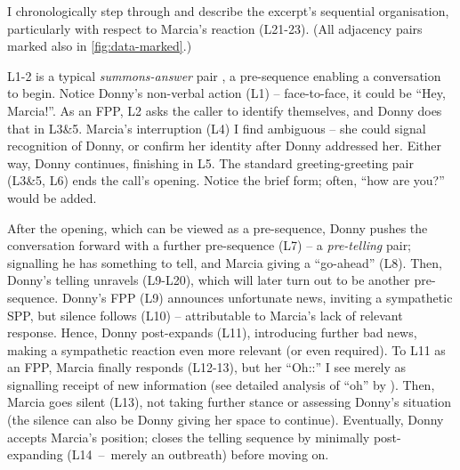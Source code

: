 \documentclass[11pt]{article}
\begin{document}
{	%
	I chronologically step through and describe the excerpt's sequential organisation, particularly with respect to Marcia's reaction (L21-23). (All adjacency pairs marked also in \autoref{fig:data-marked}.)

	L1-2 is a typical \textit{summons-answer} pair \citep[p.~126]{Liddicoat_2007}, a pre-sequence enabling a conversation to begin. Notice Donny's non-verbal action (L1) -- face-to-face, it could be ``Hey, Marcia!''.
	As an FPP, L2 asks the caller to identify themselves, and Donny does that in L3\&5.
	Marcia's interruption (L4) I find ambiguous -- she could signal recognition of Donny, or confirm her identity after Donny addressed her. Either way, Donny continues, finishing in L5.
	The standard greeting-greeting pair (L3\&5, L6) ends the call's opening. Notice the brief form; often, ``how are you?'' would be added.

	After the opening, which can be viewed as a pre-sequence, Donny pushes the conversation forward with a further pre-sequence (L7) -- a \textit{pre-telling} \citep[p.~136]{Liddicoat_2007} pair; signalling he has something to tell, and Marcia giving a ``go-ahead'' (L8).
	Then, Donny's telling unravels (L9-L20), which will later turn out to be another pre-sequence.
	Donny's FPP (L9) announces unfortunate news, inviting a sympathetic SPP, but silence follows (L10) -- attributable to Marcia's lack of relevant response.
	Hence, Donny post-expands (L11), introducing further bad news, making a sympathetic reaction even more relevant (or even required).
	To L11 as an FPP, Marcia finally responds (L12-13), but her ``Oh::'' I see merely as signalling receipt of new information (see detailed analysis of ``oh'' by \citet{Heritage_1984}). Then, Marcia goes silent (L13), not taking further stance or assessing Donny's situation (the silence can also be Donny giving her space to continue).
	Eventually,	Donny accepts Marcia's position; closes the telling sequence by minimally post-expanding (L14~--~merely an outbreath) before moving on.

}
\end{document}
